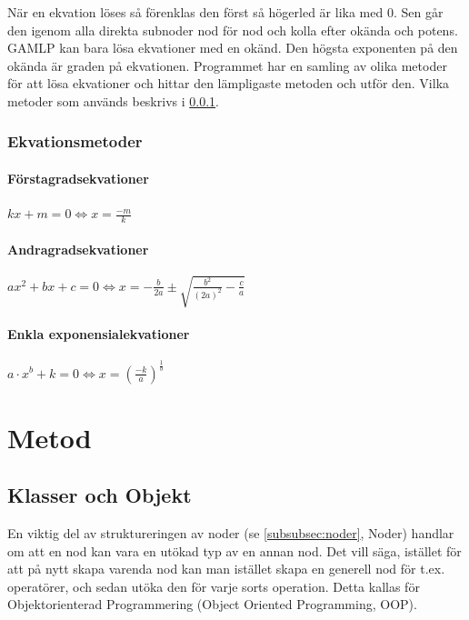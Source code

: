 \documentclass[12pt,a4paper]{article}
\begin{document}
När en ekvation löses så förenklas den först så högerled är lika med 0. Sen går den igenom alla direkta subnoder nod för nod och kolla efter okända och potens. GAMLP kan bara lösa ekvationer med en okänd. Den högsta exponenten på den okända är graden på ekvationen. Programmet har en samling av olika metoder för att lösa ekvationer och hittar den lämpligaste metoden och utför den. Vilka metoder som används beskrivs i \ref{subsubsec:Ekvationsmetoder}.
\subsubsection{Ekvationsmetoder}
\label{subsubsec:Ekvationsmetoder}
\paragraph{Förstagradsekvationer}
\(kx+m=0\Leftrightarrow x=\frac{-m}{k}\)
\paragraph{Andragradsekvationer}
\(ax^{2}+bx+c=0\Leftrightarrow x=-\frac{b}{2a}\pm \sqrt{\frac{b^{2}}{(2a)^{2}}-\frac{c}{a}}\)
\paragraph{Enkla exponensialekvationer}
\(a\cdot x^{b}+k=0\Leftrightarrow x=(\frac{-k}{a})^{\frac{1}{b}}\)
\section{Metod}
\subsection{Klasser och Objekt}
\label{subsection:klasserochobjekt}
En viktig del av struktureringen av noder (se \ref{subsubsec:noder}, Noder) handlar om att en nod kan vara en utökad typ av en annan nod. Det vill säga, istället för att på nytt skapa varenda nod kan man istället skapa en generell nod för t.ex. operatörer, och sedan utöka den för varje sorts operation. Detta kallas för Objektorienterad Programmering (Object Oriented Programming, OOP). 
\end{document}
